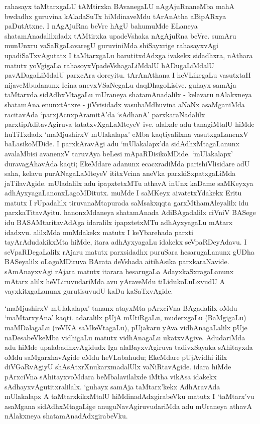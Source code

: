 rahasayx taMtarxgaLU tAMtirxka BAvanegaLU nAgAjuRnaneMba mahA bwdadhx guruvina kAladaSuTx hiMdinaveMdu tArAnAtha aBipARxya paDutAtxne. I nAgAjuRna beVre hAgU bahumuMde ELaneya shatamAnadalilxdadx tAMtirxka upadeVshaka nAgAjuRna beVre. sumAru munUnxru vaSaRgaLavaregU guruviniMda shiSayxrige rahasayxvAgi upadiSaTxvAgutatx I taMtarxgaLu barutitxdAdxga ivakekx sidadhxra, nAthara matutx yoVgigaLa rahasoyxVpadeVshagaLiMdalU hADugaLiMdalU pavADagaLiMdalU parxcAra doreyitu. tArAnAthana I heVLikegaLu vasutxtaH nijaveMbudanunx Icina anevxVSaNegaLu daqDhagoLisive. guhayx samAja taMtarxda sidAdhxMtagaLu mUraneya shatamAnadalilx - kelavaru nAlakxneya shatamAna enunxtAtxre - jiVvisidadx vasubaMdhuvina aNaNx asaMganiMda racitavAda `parxjAcnxpAramitA'da `sAdhanA' parxkaraNadalilx parxtipAditavAgiruva tatatxvXgaLaMteyeV ive. alalxde adu tanagiMtalU hiMde huTiTxdadx `maMjushirxV mUlakalapx' eMba kaqtiyalilxna vasutxgaLanenxV baLasikoMDide. I parxkAravAgi adu `mUlakalapx'da sidAdhxMtagaLanunx avalaMbisi avanenxV taruvAya beLesi mApaRDisikoMDide. `mUlakalapx' duravagAhavAda kaqti; EkeMdare adanunx ecacxradiMda parishiVlisidare adU saha, kelavu purANagaLaMteyeV ititxVcina aneVka parxkiSxpatxgaLiMda jaTilavAgide. mUladalilx adu ipapxtetxMTu athavA inUnx kaDame saMKeyxya adhAyxyagaLanonxLagoMDitutx. muMde I saMKeyx aivatetxYdakekx Eritu matutx I rUpadalilx tiruvanaMtapurada saMsakxqqta garxMthamAleyalilx idu parxkaTitavAyitu. hanonxMdaneya shatamAnada AdiBAgadalilx ciVniV BASege idu BASAMtaritavAdAga idaralilx ipapxtetxMTu adhAyxyagaLu mAtarx idadxvu. alilxMda muMdakekx matutx I keYbarehada parxti tayArAdudakikxMta hiMde, itara adhAyxyagaLu idakekx seVpaRDeyAdavu. I seVpaRDegaLalilx rAjaru matutx parxsidadhx puruSara hesarugaLanunx gUDha BASeyalilx oLagoMDiruva BArata deVshada aitihAsika parxkaraNavide. sAmAnayxvAgi rAjara matutx itarara hesarugaLa AdayxkaSxragaLanunx mAtarx alilx heVLiruvudariMda avu yAraveMdu tiLidukoLuLxvudU A vayxkitxgaLanunx gurutisuvudU kaDu kaSaTxvAgide.

`maMjushirxV mUlakalapx' tananx atayxMta pArxciVna BAgadalilx oMdu `maMtarxyAna' kaqti. adaralilx pUjA mUtiRgaLu, muderxgaLu (BaMgigaLu) maMDalagaLu (reVKA saMkeVta\-gaLu), pUjakaru yAva vidhAnagaLalilx pUje naDesabeVkeMba vidhigaLu matutx vidhAnagaLu ukatxvAgive. AdudariMda adu hiMde upalabadhxvAgidudx Iga alaBayxvAgiruva tadivxSayaka sAhitayxda oMdu saMgarxhavAgide eMdu heVLabahudu; EkeMdare pUjAvidhi ililx diVGaRvAgiyU shAsAtxrXnukarxmadalUlx vaNiRtavAgide. idara hiMde pArxciVna sAhitayxvoMdara beMbalavilalxde iMtha vikAsa idakekx sAdhayxvAgutitxralilalx. `guhayx samAja taMtarx'kekx AdhAravAda mUlakalapx A taMtarxkikxMtalU hiMdinadAdxgirabeVku matutx I `taMtarx'vu asaMgana sidAdhxMtagaLige anuguNavAgiruvudariMda adu mUraneya athavA nAlakxneya shatamAnadAdxgirabeVku.

